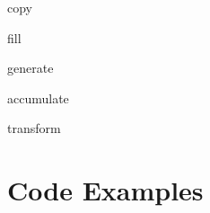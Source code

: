 \documentclass{beamer}
\begin{document}
\begin{frame}{copy}

\end{frame}

\begin{frame}{fill}

\end{frame}

\begin{frame}{generate}

\end{frame}

\begin{frame}{accumulate}

\end{frame}

\begin{frame}{transform}

\end{frame}

\section{Code Examples}

\end{document}
